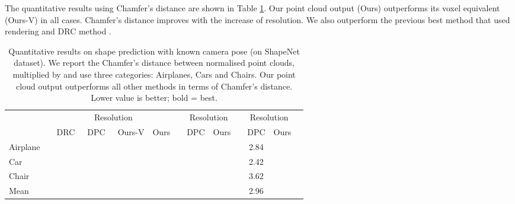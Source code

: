 \documentclass[runningheads]{llncs}
\begin{document}
The quantitative results using Chamfer's distance \cite{sun2018pix3d} are shown in Table \ref{tbl:quantiative_results_shape}. Our point cloud output (Ours) outperforms its voxel equivalent (Ours-V) in all cases. Chamfer's distance improves with the increase of resolution. We also outperform the previous best method that used rendering \cite{DBLP:journals/corr/abs-1810-09381} and DRC method \cite{tulsiani2018multiview}.

\begin{table}[hbt!]
\caption{\label{tbl:quantiative_results_shape} Quantitative results on shape prediction with known camera pose (on ShapeNet dataset). We report the Chamfer's distance between normalised point clouds, multiplied by  and use three categories: Airplanes, Cars and Chairs. Our point cloud output outperforms all other methods in terms of Chamfer's distance. Lower value is better; bold = best.}
\centering
{\small
\begin{tabular}{lcccccccccccc}
\toprule
          & & \multicolumn{4}{c}{Resolution } & & \multicolumn{2}{c}{ Resolution } & & \multicolumn{2}{c}{ Resolution } \\
          & & DRC~\cite{tulsiani2017multiview}  & DPC~\cite{DBLP:journals/corr/abs-1810-09381}  &Ours-V& Ours  & & DPC \cite{DBLP:journals/corr/abs-1810-09381}  & Ours             & & DPC \cite{DBLP:journals/corr/abs-1810-09381} & Ours       \\ \midrule
Airplane  & &&&& & &   &            & & 2.84 &      \\
Car       & &&&& & &   &            & & 2.42 &      \\
Chair     & &&&& & &   &            & & 3.62 &      \\
\midrule
Mean      & &&&& & &   &            & & 2.96 &      \\
\bottomrule
\end{tabular}
}
\vspace{2mm}
\end{table}

\FloatBarrier
\end{document}

